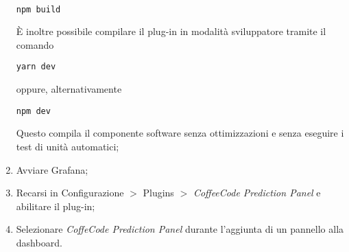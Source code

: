\documentclass[../manuale-utente.tex]{subfiles}
\begin{document}
\begin{enumerate}
    \\ \centerline{\texttt{npm build}}
    È inoltre possibile compilare il plug-in in modalità sviluppatore tramite il comando
    \\ \centerline{\texttt{yarn dev}}
    oppure, alternativamente
    \\ \centerline{\texttt{npm dev}}
    Questo compila il componente software senza ottimizzazioni e senza eseguire i test di unità automatici;
    \item Avviare Grafana;
    \item Recarsi in Configurazione $>$ Plugins $>$ \emph{CoffeeCode Prediction Panel} e abilitare il plug-in;
    \item Selezionare \emph{CoffeCode Prediction Panel} durante l'aggiunta di un pannello alla dashboard.
\end{enumerate}
\end{document}
